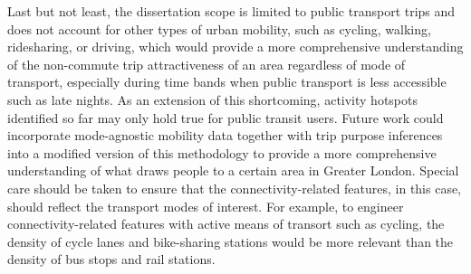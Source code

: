 Last but not least, the dissertation scope is limited to public transport trips and does not account for other types of urban mobility, such as cycling, walking, ridesharing, or driving, which would provide a more comprehensive understanding of the non-commute trip attractiveness of an area regardless of mode of transport, especially during time bands when public transport is less accessible such as late nights. As an extension of this shortcoming, activity hotspots identified so far may only hold true for public transit users. Future work could incorporate mode-agnostic mobility data together with trip purpose inferences into a modified version of this methodology to provide a more comprehensive understanding of what draws people to a certain area in Greater London. Special care should be taken to ensure that the connectivity-related features, in this case, should reflect the transport modes of interest. For example, to engineer connectivity-related features with active means of transort such as cycling, the density of cycle lanes and bike-sharing stations would be more relevant than the density of bus stops and rail stations.